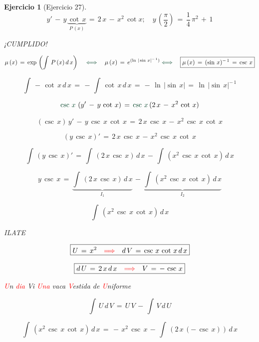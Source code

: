 \documentclass[a4paper,11pt,openany]{book}
\newtheorem{ejer}{Ejercicio}[section]
\begin{document}
\begin{ejer}[Ejercicio 27] 

$$y'\,-\,y\,\underbrace{\cot\,x}_{P\,(x)}\,=\,2\,x\,-\,x^{2}\,\cot{x}; \quad y\,\left(\dfrac{\pi}{2} \right)\,=\,\dfrac{1}{4}\,\pi^{2}\,+\,1$$ 

¡CUMPLIDO! 


 $$\mu\,(x)\,=\,\exp\,\left(\int\,P\,(x)\,d\,x \right) \quad \textcolor{britishracinggreen}{\iff} \quad \mu\,(x)\,=\,e^{(\ln\,|\sin\,x|^{-\,1})} \textcolor{britishracinggreen}{\iff} \quad \boxed{\mu\,(x)\,=\,(\sin\,x)^{-\,1}\,=\,\csc\,x}$$ 

$$\int\,-\,\cot\,x\,d\,x\,=\,-\,\int\,\cot\,x\,d\,x\,=\,-\,\ln\,|\sin\,x|\,=\,\boxed{\ln\,|\sin\,x|^{-\,1}}$$ 

 $$\textcolor{britishracinggreen}{\csc\,x}\,\left(y'\,-\,y\,\cot\,x \right)\,=\,\textcolor{britishracinggreen}{\csc\,x}\,(2\,x\,-\,x^{2}\,\cot\,x) $$ 

$$(\csc\,x)\,y'\,-\,y\,\csc\,x\,\cot\,x\,=\,2\,x\,\csc\,x\,-\,x^{2}\,\csc\,x\,\cot\,x$$ 

$$\left(y\,\csc\,x \right)'\,=\,2\,x\,\csc\,x\,-\,x^{2}\,\csc\,x\,\cot\,x $$

 $$\int\,\left(y\,\csc\,x \right)'\,=\,\int\,\left( 2\,x\,\csc\,x \right)\,d\,x\,-\,\int\,\left(x^{2}\,\csc\,x\,\cot\,x \right)\,d\,x$$ 

$$y\,\csc\,x\,=\,\underbrace{\int\,\left( 2\,x\,\csc\,x \right)\,d\,x}_{I_{1}}\,-\,\underbrace{\int\,\left(x^{2}\,\csc\,x\,\cot\,x \right)\,d\,x}_{I_{2}}$$ 

\begin{tcolorbox}[colback=red!5!white,colframe=red!75!black,fonttitle=\bfseries,title=$I_{2}$]  

$$\int\,\left(x^{2}\,\csc\,x\,\cot\,x \right)\,d\,x$$ 

ILATE 

$$\boxed{U\,=\,x^{2} \quad \textcolor{red}{\Longrightarrow} \quad d\,V\,=\,\csc\,x\,\cot\,x\,d\,x }$$ 

$$\boxed{d\,U\,=\,2\,x\,d\,x \quad \textcolor{red}{\Longrightarrow} \quad V\,=\,-\,\csc\,x }$$ 

\textcolor{red}{U}n \textcolor{red}{dia} Vi \textcolor{red}{Una} vaca \textcolor{red}{V}estida de \textcolor{red}{U}niforme      

$$\int\,U\,d\,V\,=\,U\,V\,-\,\int\,V\,d\,U$$ 

$$\int\,\left(x^{2}\,\csc\,x\,\cot\,x \right)\,d\,x\,=\,-\,x^{2}\,\csc\,x\,-\,\int\,\left(2\,x\,(-\,\csc\,x) \right)\,d\,x$$ 


\end{tcolorbox}
\end{ejer}
\end{document}

